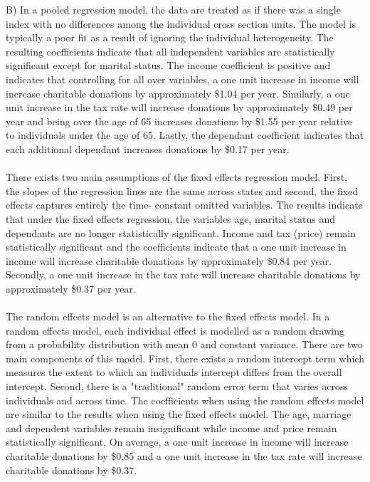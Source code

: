 \documentclass[12pt]{article}
\begin{document}
B) In a pooled regression model, the data are treated as if there was a single index with no differences among the individual cross section units. The model is typically a poor fit as a result of ignoring the individual heterogeneity. The resulting coefficients indicate that all independent variables are statistically significant except for marital status. The income coefficient is positive and indicates that controlling for all over variables, a one unit increase in income will increase charitable donations by approximately \$1.04 per year. Similarly, a one unit increase in the tax rate will increase donations by approximately \$0.49 per year and being over the age of 65 increases donations by \$1.55 per year relative to individuals under the age of 65. Lastly, the dependant coefficient indicates that each additional dependant increases donations by \$0.17 per year. \\\\
\hspace{\parindent}There exists two main assumptions of the fixed effects regression model. First, the slopes of the regression lines are the same across states and second, the fixed effects captures entirely the time- constant omitted variables. The results indicate that under the fixed effects regression, the variables age, marital status and dependants are no longer statistically significant. Income and tax (price) remain statistically significant and the coefficients indicate that a one unit increase in income will increase charitable donations by approximately \$0.84 per year. Secondly, a one unit increase in the tax rate will increase charitable donations by approximately \$0.37 per year. \\\\
\hspace{\parindent}The random effects model is an alternative to the fixed effects model. In a random effects model, each individual effect is modelled as a random drawing from a probability distribution with mean 0 and constant variance. There are two main components of this model. First, there exists a random intercept term which measures the extent to which an individuals intercept differs from the overall intercept. Second, there is a "traditional" random error term that varies across individuals and across time. The coefficients when using the random effects model are similar to the results when using the fixed effects model. The age, marriage and dependent variables remain insignificant while income and price remain statistically significant. On average, a one unit increase in income will increase charitable donations by \$0.85 and a one unit increase in the tax rate will increase charitable donations by \$0.37.\\
\end{document}
